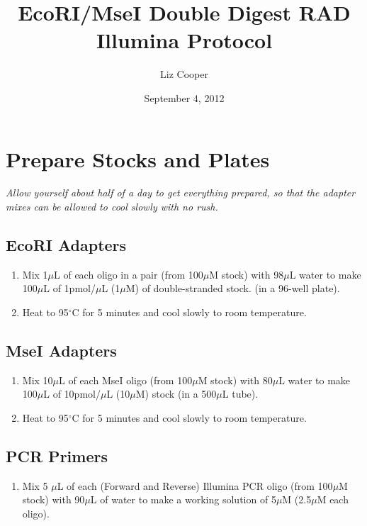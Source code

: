 \documentclass{article}
\begin{document}
\title{EcoRI/MseI Double Digest RAD Illumina Protocol}
\author{Liz Cooper}
\date{September 4, 2012}
\maketitle

\section{Prepare Stocks and Plates}\label{sec:prep}
\emph{Allow yourself about half of a day to get everything prepared, so that the adapter mixes can be allowed to cool slowly with no rush.}

\subsection{EcoRI Adapters}
\begin{enumerate}
	\item  Mix 1$\mu$L of each oligo in a pair (from 100$\mu$M stock) with 98$\mu$L water to make 100$\mu$L of 1pmol/$\mu$L (1$\mu$M) of double-stranded stock. (in a 96-well plate).
	\item  Heat to 95$^{\circ}$C for 5 minutes and cool slowly to room temperature.
\end{enumerate}
	
\subsection{MseI Adapters}
\begin{enumerate}
	\item	  Mix 10$\mu$L of each MseI oligo (from 100$\mu$M stock) with 80$\mu$L water to make 100$\mu$L of 10pmol/$\mu$L (10$\mu$M) stock (in a 500$\mu$L tube).
	\item   Heat to 95$^{\circ}$C for 5 minutes and cool slowly to room temperature.
\end{enumerate}
	
\subsection{PCR Primers}
\begin{enumerate}
	\item Mix 5 $\mu$L of each (Forward and Reverse) Illumina PCR oligo (from 100$\mu$M stock) with 90$\mu$L of water to make a working solution of 5$\mu$M (2.5$\mu$M each oligo).
\end{enumerate}
\end{document}
